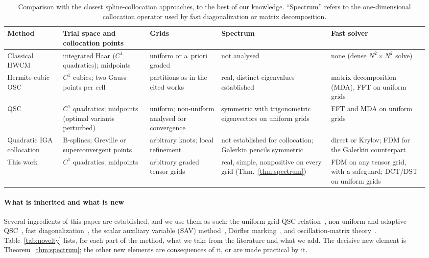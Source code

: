 \documentclass[preprint,12pt]{elsarticle}
\theoremstyle{remark}
\begin{document}
\begin{table}[t]\centering\footnotesize
\caption{Comparison with the closest spline-collocation approaches, to the best of our knowledge. ``Spectrum'' refers to the one-dimensional collocation operator used by fast diagonalization or matrix decomposition.}\label{tab:closest}
\begin{tabular}{p{2.2cm}p{2.6cm}p{2.0cm}p{3.4cm}p{2.6cm}}
\toprule
Method & Trial space and collocation points & Grids & Spectrum & Fast solver\\
\midrule
Classical HWCM~\cite{lepik2011solving,oruc2019nonuniform} & integrated Haar ($C^1$ quadratics); midpoints & uniform or a~priori graded & not analysed & none (dense $N^2\times N^2$ solve)\\
Hermite-cubic OSC~\cite{dyksen1987tensor,sun1999spectral,bialecki1995matrix} & $C^1$ cubics; two Gauss points per cell & partitions as in the cited works & real, distinct eigenvalues established & matrix decomposition (MDA), FFT on uniform grids\\
QSC~\cite{houstis1988quadratic,christara2002fast,christara2006optimal} & $C^1$ quadratics; midpoints (optimal variants perturbed) & uniform; non-uniform analysed for convergence & symmetric with trigonometric eigenvectors on uniform grids & FFT and MDA on uniform grids\\
Quadratic IGA collocation~\cite{auricchio2010isogeometric,schillinger2013isogeometric,delorenzis2015isogeometric} & B-splines; Greville or superconvergent points & arbitrary knots; local refinement & not established for collocation; Galerkin pencils symmetric~\cite{sangalli2016isogeometric} & direct or Krylov; FDM for the Galerkin counterpart\\
This work & $C^1$ quadratics; midpoints & arbitrary graded tensor grids & real, simple, nonpositive on every grid (Thm.~\ref{thm:spectrum}) & FDM on any tensor grid, with a safeguard; DCT/DST on uniform grids\\
\bottomrule
\end{tabular}
\end{table}

\paragraph{What is inherited and what is new}
Several ingredients of this paper are established, and we use them as such: the uniform-grid QSC
relation~\cite{houstis1988quadratic}, non-uniform and adaptive QSC~\cite{christara2006optimal,christara2006adaptive},
fast diagonalization~\cite{lynch1964direct}, the scalar auxiliary variable (SAV)
method~\cite{shen2018scalar}, D\"orfler marking~\cite{dorfler1996convergent}, and oscillation-matrix
theory~\cite{gantmacher2002oscillation}. Table~\ref{tab:novelty} lists, for each part of the method, what
we take from the literature and what we add. The decisive new element is Theorem~\ref{thm:spectrum}; the
other new elements are consequences of it, or are made practical by it.
\end{document}
